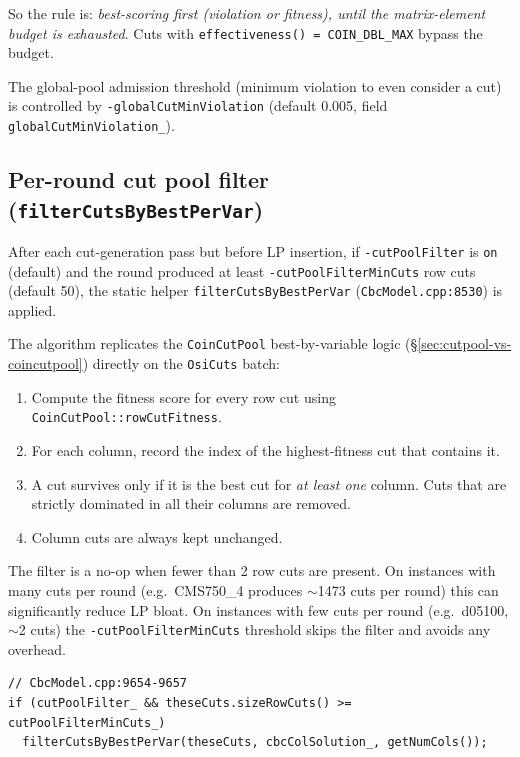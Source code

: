 \documentclass[11pt,a4paper]{article}
\begin{document}
So the rule is: \emph{best-scoring first (violation or fitness),
until the matrix-element budget is exhausted}.  Cuts with
\texttt{effectiveness() = COIN\_DBL\_MAX} bypass the budget.

The global-pool admission threshold (minimum violation to even
consider a cut) is controlled by \texttt{-globalCutMinViolation}
(default 0.005, field \texttt{globalCutMinViolation\_}).

\subsection*{Per-round cut pool filter (\texttt{filterCutsByBestPerVar})}
\label{sec:roundfilter}

After each cut-generation pass but before LP insertion, if
\texttt{-cutPoolFilter} is \texttt{on} (default) and the round
produced at least \texttt{-cutPoolFilterMinCuts} row cuts (default
50), the static helper \texttt{filterCutsByBestPerVar}
(\texttt{CbcModel.cpp:8530}) is applied.

The algorithm replicates the \texttt{CoinCutPool} best-by-variable
logic (\S\ref{sec:cutpool-vs-coincutpool}) directly on the
\texttt{OsiCuts} batch:

\begin{enumerate}[leftmargin=*]
  \item Compute the fitness score for every row cut using
        \texttt{CoinCutPool::rowCutFitness}.
  \item For each column, record the index of the highest-fitness cut
        that contains it.
  \item A cut survives only if it is the best cut for \emph{at least
        one} column.  Cuts that are strictly dominated in all their
        columns are removed.
  \item Column cuts are always kept unchanged.
\end{enumerate}

The filter is a no-op when fewer than 2 row cuts are present.
On instances with many cuts per round (e.g.\ CMS750\_4 produces
$\sim$1473 cuts per round) this can significantly reduce LP bloat.
On instances with few cuts per round (e.g.\ d05100, $\sim$2 cuts)
the \texttt{-cutPoolFilterMinCuts} threshold skips the filter and
avoids any overhead.

\begin{lstlisting}
// CbcModel.cpp:9654-9657
if (cutPoolFilter_ && theseCuts.sizeRowCuts() >= cutPoolFilterMinCuts_)
  filterCutsByBestPerVar(theseCuts, cbcColSolution_, getNumCols());
\end{lstlisting}
\end{document}
